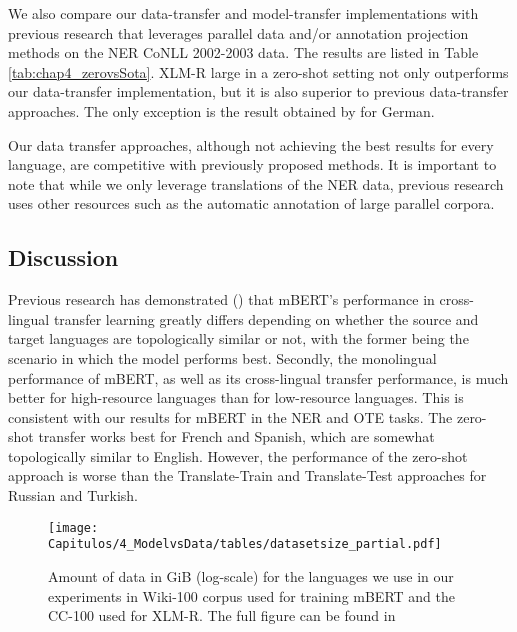 

We also compare our data-transfer and model-transfer implementations with previous research that leverages parallel data and/or annotation projection methods on the NER CoNLL 2002-2003 data. The results are listed in Table \ref{tab:chap4_zerovsSota}. XLM-R large in a zero-shot setting not only outperforms our data-transfer implementation, but it is also superior to previous data-transfer approaches. The only exception is the result obtained by \cite{Li2021CrossLingualNE} for German. 

Our data transfer approaches, although not achieving the best results for every language, are competitive with previously proposed methods. It is important to note that while we only leverage translations of the NER data, previous research uses other resources such as the automatic annotation of large parallel corpora.



\subsection{Discussion}


Previous research has demonstrated (\cite{pires-etal-2019-multilingual, wu-dredze-2020-languages}) that mBERT's performance in cross-lingual transfer learning greatly differs depending on whether the source and target languages are topologically similar or not, with the former being the scenario in which the model performs best. Secondly, the monolingual performance of mBERT, as well as its cross-lingual transfer performance, is much better for high-resource languages than for low-resource languages. This is consistent with our results for mBERT in the NER and OTE tasks. The zero-shot transfer works best for French and Spanish, which are somewhat topologically similar to English. However, the performance of the zero-shot approach is worse than the Translate-Train and Translate-Test approaches for Russian and Turkish. 


\begin{figure}[htb]
    \centering
    \texttt{[image: Capitulos/4\_ModelvsData/tables/datasetsize\_partial.pdf]}
    \caption{Amount of data in GiB (log-scale) for the languages we use in our experiments in Wiki-100 corpus used for training mBERT and the CC-100 used for XLM-R. The full figure can be found in \cite{conneau-etal-2020-unsupervised}}
    \label{fig:chapter4_pretraining_size}
\end{figure}


